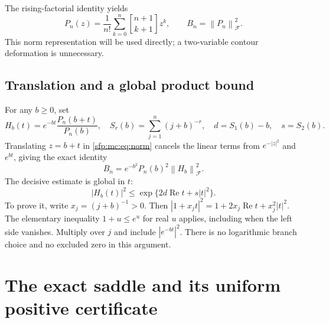 \documentclass[11pt,letterpaper]{article}
\numberwithin{equation}{section}
\theoremstyle{definition}\newtheorem{definition}[theorem]{Definition}
\theoremstyle{remark}\newtheorem{remark}[theorem]{Remark}
\newcommand{\sone}[2]{\genfrac{[}{]}{0pt}{}{#1}{#2}}
\newcommand{\stir}{\sone}
\newcommand{\Fock}[1]{\left\lVert #1\right\rVert_{\mathcal F}^{2}}
\begin{document}
The rising-factorial identity yields
\begin{equation}\label{sfp:mc:eq:polynomial}
 P_n(z)=\frac1{n!}\sum_{k=0}^{n}\stir{n+1}{k+1}z^k,
 \qquad B_n=\Fock{P_n}.
\end{equation}
This norm representation will be used directly; a two-variable
contour deformation is unnecessary.

\subsection{Translation and a global product bound}
For any $b\geq0$, set
\begin{equation}\label{sfp:mc:eq:offcenterdefs}
 H_b(t)=e^{-bt}\frac{P_n(b+t)}{P_n(b)},\quad
 S_r(b)=\sum_{j=1}^{n}(j+b)^{-r},\quad
 d=S_1(b)-b,\quad s=S_2(b).
\end{equation}
Translating $z=b+t$ in \eqref{sfp:mc:eq:norm} cancels the linear terms
from $e^{-|z|^2}$ and $e^{bt}$, giving the exact identity
\begin{equation}\label{sfp:mc:eq:translation}
 B_n=e^{-b^2}P_n(b)^2\Fock{H_b}.
\end{equation}
The decisive estimate is global in $t$:
\begin{equation}\label{sfp:mc:eq:global}
 |H_b(t)|^2\leq\exp\{2d\operatorname{Re}t+s|t|^2\}.
\end{equation}
To prove it, write $x_j=(j+b)^{-1}>0$. Then
$|1+x_jt|^2=1+2x_j\operatorname{Re}t+x_j^2|t|^2$.
The elementary inequality $1+u\leq e^u$ for real $u$ applies,
including when the left side vanishes. Multiply over $j$ and
include $|e^{-bt}|^2$. There is no logarithmic branch choice and
no excluded zero in this argument.

\section{The exact saddle and its uniform positive certificate}
\label{sfp:mc:sec:exact}
\end{document}
